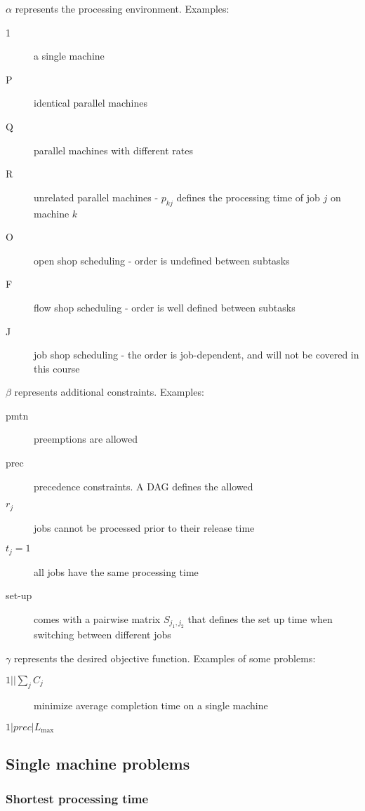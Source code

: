 \documentclass{idc_msc}
\begin{document}
\(\alpha\) represents the processing environment. Examples:

\begin{description}
  \item[1] a single machine
  \item[P] identical parallel machines
  \item[Q] parallel machines with different rates
  \item[R] unrelated parallel machines - \(p_{kj}\) defines the processing time of job \(j\) on machine \(k\)
  \item[O] open shop scheduling - order is undefined between subtasks
  \item[F] flow shop scheduling - order is well defined between subtasks
  \item[J] job shop scheduling - the order is job-dependent, and will not be covered in this course
\end{description}

\(\beta\) represents additional constraints. Examples:

\begin{description}
  \item[pmtn] preemptions are allowed
  \item[prec] precedence constraints. A DAG defines the allowed 
  \item[\(r_j\)] jobs cannot be processed prior to their release time
  \item[\(t_j = 1\)] all jobs have the same processing time
  \item[set-up] comes with a pairwise matrix \(S_{j_1,j_2}\) that defines the set up time when switching between different jobs
\end{description}

\(\gamma\) represents the desired objective function. Examples of some problems:

\begin{description}
  \item[\(1||\sum_j C_j\)] minimize average completion time on a single machine
  \item[\(1|prec|L_{\max}\)]
\end{description}

\subsection{Single machine problems}

\subsubsection{Shortest processing time}
\end{document}
